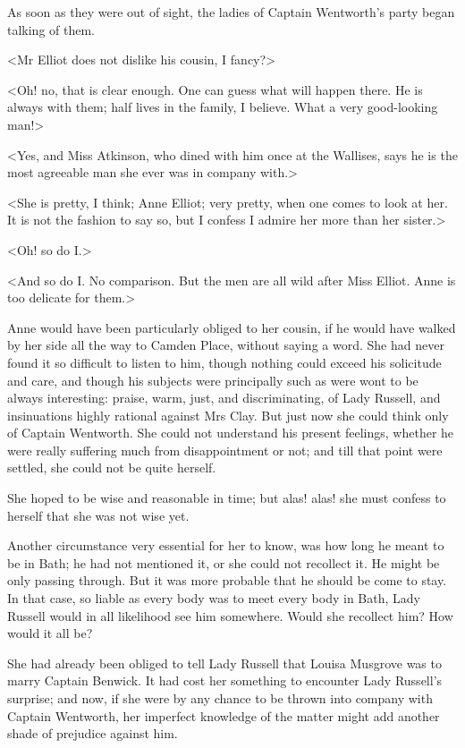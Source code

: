 As soon as they were out of sight, the ladies of Captain Wentworth's party began talking of them.

<Mr Elliot does not dislike his cousin, I fancy?>

<Oh! no, that is clear enough. One can guess what will happen there. He is always with them; half lives in the family, I believe. What a very good-looking man!>

<Yes, and Miss Atkinson, who dined with him once at the Wallises, says he is the most agreeable man she ever was in company with.>

<She is pretty, I think; Anne Elliot; very pretty, when one comes to look at her. It is not the fashion to say so, but I confess I admire her more than her sister.>

<Oh! so do I\@.>

<And so do I\@. No comparison. But the men are all wild after Miss Elliot. Anne is too delicate for them.>

Anne would have been particularly obliged to her cousin, if he would have walked by her side all the way to Camden Place, without saying a word. She had never found it so difficult to listen to him, though nothing could exceed his solicitude and care, and though his subjects were principally such as were wont to be always interesting: praise, warm, just, and discriminating, of Lady Russell, and insinuations highly rational against Mrs Clay. But just now she could think only of Captain Wentworth. She could not understand his present feelings, whether he were really suffering much from disappointment or not; and till that point were settled, she could not be quite herself.

She hoped to be wise and reasonable in time; but alas! alas! she must confess to herself that she was not wise yet.

Another circumstance very essential for her to know, was how long he meant to be in Bath; he had not mentioned it, or she could not recollect it. He might be only passing through. But it was more probable that he should be come to stay. In that case, so liable as every body was to meet every body in Bath, Lady Russell would in all likelihood see him somewhere. Would she recollect him? How would it all be?

She had already been obliged to tell Lady Russell that Louisa Musgrove was to marry Captain Benwick. It had cost her something to encounter Lady Russell's surprise; and now, if she were by any chance to be thrown into company with Captain Wentworth, her imperfect knowledge of the matter might add another shade of prejudice against him.

